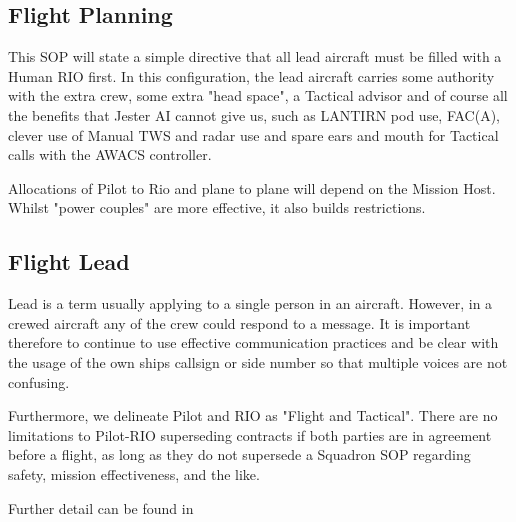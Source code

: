 \subsection*{Flight Planning}

This SOP will state a simple directive that all lead aircraft must be filled
with a Human RIO first. In this configuration, the lead aircraft carries some
authority with the extra crew, some extra "head space", a Tactical advisor and
of course all the benefits that Jester AI cannot give us, such as LANTIRN pod
use, FAC(A), clever use of Manual TWS and radar use and spare ears and mouth
for Tactical calls with the AWACS controller.

Allocations of Pilot to Rio and plane to plane will depend on the Mission Host.
Whilst "power couples" are more effective, it also builds restrictions.

\subsection*{Flight Lead}

Lead is a term usually applying to a single person in an aircraft. However, in
a crewed aircraft any of the crew could respond to a message. It is important
therefore to continue to use effective communication practices and be clear
with the usage of the own ships callsign or side number so that multiple voices
are not confusing.

Furthermore, we delineate Pilot and RIO as "Flight and Tactical". There are no
limitations to Pilot-RIO superseding contracts if both parties are in agreement
before a flight, as long as they do not supersede a Squadron SOP regarding
safety, mission effectiveness, and the like.

Further detail can be found in 
